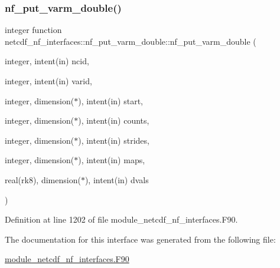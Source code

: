 \subsubsection{\texorpdfstring{nf\+\_\+put\+\_\+varm\+\_\+double()}{nf\_put\_varm\_double()}}
{\footnotesize\ttfamily integer function netcdf\+\_\+nf\+\_\+interfaces\+::nf\+\_\+put\+\_\+varm\+\_\+double\+::nf\+\_\+put\+\_\+varm\+\_\+double (\begin{DoxyParamCaption}\item[{integer, intent(in)}]{ncid,  }\item[{integer, intent(in)}]{varid,  }\item[{integer, dimension($\ast$), intent(in)}]{start,  }\item[{integer, dimension($\ast$), intent(in)}]{counts,  }\item[{integer, dimension($\ast$), intent(in)}]{strides,  }\item[{integer, dimension($\ast$), intent(in)}]{maps,  }\item[{real(rk8), dimension($\ast$), intent(in)}]{dvals }\end{DoxyParamCaption})}



Definition at line 1202 of file module\+\_\+netcdf\+\_\+nf\+\_\+interfaces.\+F90.



The documentation for this interface was generated from the following file\+:\begin{DoxyCompactItemize}
\item 
\hyperlink{module__netcdf__nf__interfaces_8F90}{module\+\_\+netcdf\+\_\+nf\+\_\+interfaces.\+F90}\end{DoxyCompactItemize}
